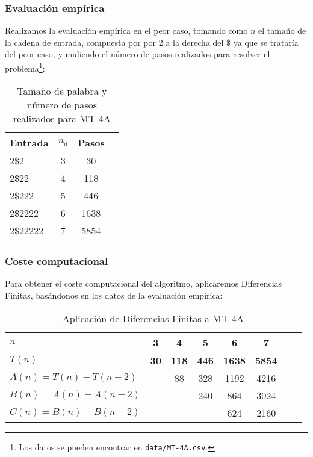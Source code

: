 \subsubsection*{Evaluación empírica}
Realizamos la evaluación empírica en el peor caso, tomando como $n$ el tamaño de la cadena de entrada, compuesta por por 2 a la derecha del \$ ya que se trataría del peor caso, y midiendo el número de pasos realizados para resolver el problema\footnote{Los datos se pueden encontrar en \texttt{data/MT-4A.csv}.}:

\begin{table}[H]
    \centering
    \begin{tabular}{lccc}
        Entrada & $n_d$ & Pasos \\
        \hline
        2\$2                     & 3  & 30   \\
        2\$22                    & 4  & 118   \\
        2\$222                   & 5  & 446  \\
        2\$2222                  & 6  & 1638  \\
        2\$22222                 & 7  & 5854  \\
    \end{tabular}
    \caption{Tamaño de palabra y número de pasos realizados para MT-4A}
\end{table}


\subsubsection*{Coste computacional}
Para obtener el coste computacional del algoritmo, aplicaremos Diferencias Finitas, basándonos en los datos de la evaluación empírica:

\begin{table}[H]
    \centering
    \begin{tabular}{|l|c|c|c|c|c|c|c|}
        \hline
        $n$ & \textbf{3} & \textbf{4} & \textbf{5} & \textbf{6} & \textbf{7}\\ \hline
        $T(n)$ & \textbf{30} & \textbf{118} & \textbf{446} & \textbf{1638} & \textbf{5854}      \\ \hline
        \hline
        $A(n) = T(n) - T(n-2)$ &    & 88 & 328 & 1192 & 4216 \\ \hline
        $B(n) = A(n) - A(n-2)$ &    &   & 240 & 864 & 3024 \\ \hline
        $C(n) = B(n) - B(n-2)$ &    &   &    & 624 & 2160 \\ \hline
    \end{tabular}
    \caption{Aplicación de Diferencias Finitas a MT-4A}
\end{table}

